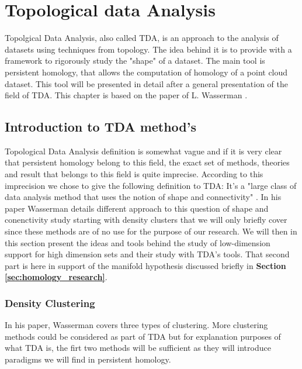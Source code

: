 \documentclass[12pt, a4paper]{article}
\begin{document}
\newpage
\thispagestyle{empty}
\mbox{}
\newpage

\section{Topological data Analysis}

Topolgical Data Analysis, also called TDA, is an approach to the analysis of datasets using techniques from topology. The idea behind it is to provide with a framework to rigorously study the "shape" of a dataset. The main tool is persistent homology, that allows the computation of homology of a point cloud dataset. This tool will be presented in detail after a general presentation of the field of TDA. This chapter is based on the paper of L. Wasserman \cite{wasserman_topological_2016}. 

\subsection{Introduction to TDA method's}

Topological Data Analysis definition is somewhat vague and if it is very clear that persistent homology belong to this field, the exact set of methods, theories and result that belongs to this field is quite imprecise. According to this imprecision we chose to give the following definition to TDA: It's a "large class of data analysis method that uses the notion of shape and connectivity" \cite{wasserman_topological_2016}. In his paper Wasserman details different approach to this question of shape and conenctivity study starting with density clusters that we will only briefly cover since these methods are of no use for the purpose of our research. We will then in this section present the ideas and tools behind the study of low-dimension support for high dimension sets and their study with TDA's tools. That second part is here in support of the manifold hypothesis discussed briefly in \textbf{Section \ref{sec:homology_research}}.

\subsubsection{Density Clustering}

In his paper, Wasserman covers three types of clustering. More clustering methods could be considered as part of TDA but for explanation purposes of what TDA is, the firt two methods will be sufficient as they will introduce paradigms we will find in persistent homology.\\
\end{document}
